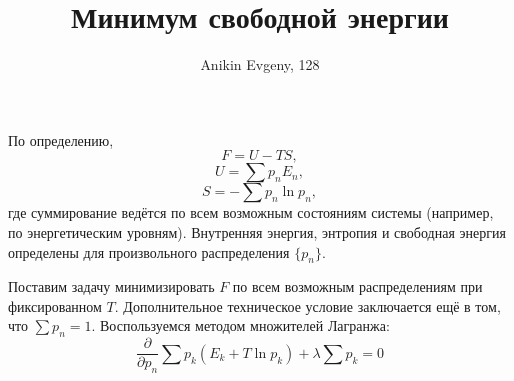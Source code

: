 \documentclass{article}
\title{Минимум свободной энергии}
\author{Anikin Evgeny, 128}
\DeclareMathOperator{\ln}{ln}
\begin{document}
\maketitle
По определению,
$$
	F = U - TS,
$$
$$
	U = \sum p_n E_n,
$$
$$
	S = -\sum p_n \ln{p_n},
$$
где суммирование ведётся по всем возможным состояниям системы (например, по энергетическим
уровням). Внутренняя энергия, энтропия и свободная энергия определены для произвольного
распределения $\{p_n\}$. 

Поставим задачу минимизировать $F$ по всем возможным распределениям при фиксированном $T$.
Дополнительное техническое условие заключается ещё в том, что $\sum p_n = 1$. Воспользуемся
методом множителей Лагранжа:
$$
	\frac{\partial}{\partial p_n} \sum p_k (E_k + T \ln{p_k}) + \lambda \sum p_k = 0
$$
\end{document}
